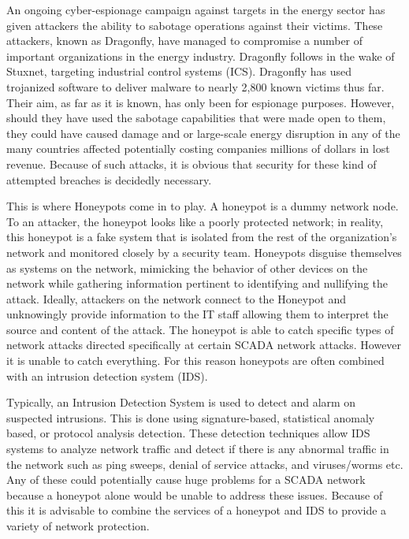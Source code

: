 An ongoing cyber-espionage campaign against targets in the energy sector has given attackers the ability to sabotage operations against their victims. These attackers, known as Dragonfly, have managed to compromise a number of important organizations in the energy industry. Dragonfly follows in the wake of Stuxnet, targeting industrial control systems (ICS). Dragonfly has used trojanized software to deliver malware to nearly 2,800 known victims thus far. Their aim, as far as it is known, has only been for espionage purposes. However, should they have used the sabotage capabilities that were made open to them, they could have caused damage and or large-scale energy disruption in any of the many countries affected potentially costing companies millions of dollars in lost revenue. Because of such attacks, it is obvious that security for these kind of attempted breaches is decidedly necessary. 

This is where Honeypots come in to play. A honeypot is a dummy network node. To an attacker, the honeypot looks like a poorly protected network; in reality, this honeypot is a fake system that is isolated from the rest of the organization’s network and monitored closely by a security team. Honeypots disguise themselves as systems on the network, mimicking the behavior of other devices on the network while gathering information pertinent to identifying and nullifying the attack. Ideally, attackers on the network connect to the Honeypot and unknowingly provide information to the IT staff allowing them to interpret the source and content of the attack. The honeypot is able to catch specific types of network attacks directed specifically at certain SCADA network attacks.  However it is unable to catch everything. For this reason honeypots are often combined with an intrusion detection system (IDS).

Typically, an Intrusion Detection System is used to detect and alarm on suspected intrusions. This is done using signature-based, statistical anomaly based, or protocol analysis detection. These detection techniques allow IDS systems to analyze network traffic and detect if there is any abnormal traffic in the network such as ping sweeps, denial of service attacks, and viruses/worms etc. Any of these could potentially cause huge problems for a SCADA network because a honeypot alone would be unable to address these issues. Because of this it is advisable to combine the services of a honeypot and IDS to provide a variety of network protection.

